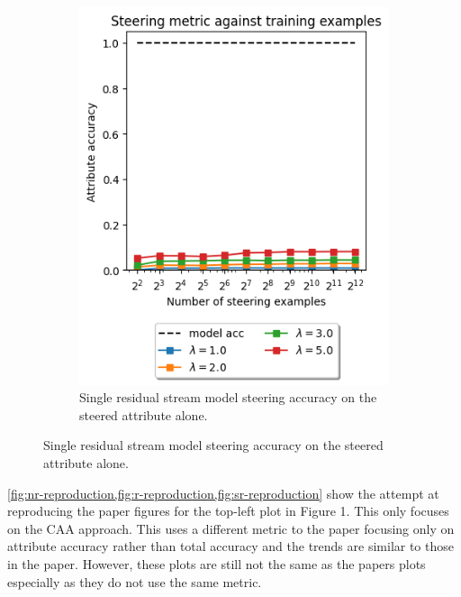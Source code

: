 \begin{figure}
\begin{subfigure}{0.45\textwidth}
        \includegraphics[width=\textwidth]{figures/single-residual-reproduction.png}
        \caption{Single residual stream model steering accuracy on the steered attribute alone.}
        \label{fig:sr-reproduction}
    \end{subfigure}
\end{figure}

\cref{fig:nr-reproduction,fig:r-reproduction,fig:sr-reproduction} show the attempt at reproducing the paper figures for the top-left plot in Figure 1.
This only focuses on the CAA approach.
This uses a different metric to the paper focusing only on attribute accuracy rather than total accuracy and the trends are similar to those in the paper.
However, these plots are still not the same as the papers plots especially as they do not use the same metric.

